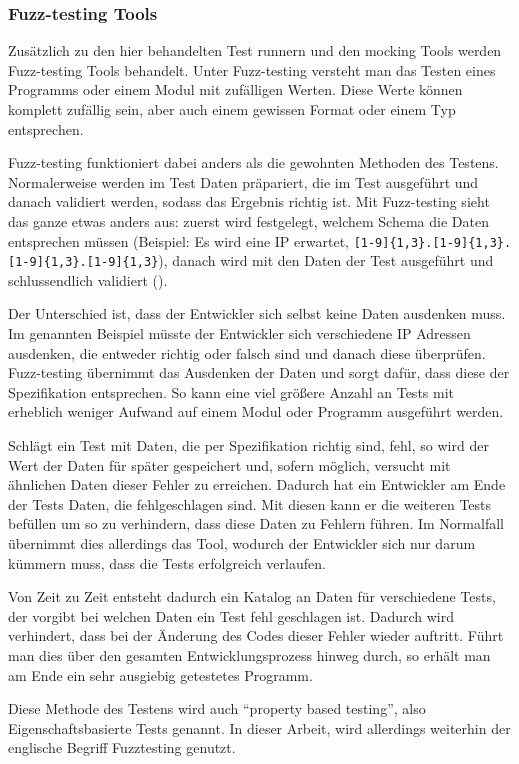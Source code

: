 \subsubsection{Fuzz-testing Tools}\label{python-tools:extlib:fuzz}

Zusätzlich zu den hier behandelten Test runnern und den \gls{mock}ing Tools 
werden Fuzz-testing Tools behandelt. Unter Fuzz-testing 
versteht man das Testen eines Programms oder einem Modul mit zufälligen Werten. 
Diese Werte können komplett zufällig sein, aber auch einem gewissen Format 
oder einem Typ entsprechen.

Fuzz-testing funktioniert dabei anders als die gewohnten Methoden des Testens. 
Normalerweise werden im Test Daten präpariert, die im Test ausgeführt und 
danach validiert werden, sodass das Ergebnis richtig ist. Mit Fuzz-testing 
sieht das ganze etwas anders aus: zuerst wird festgelegt, welchem Schema die 
Daten entsprechen müssen (Beispiel: Es wird eine IP erwartet, 
\lstinline|[1-9]{1,3}.[1-9]{1,3}.[1-9]{1,3}.[1-9]{1,3}|), danach wird mit den 
Daten der Test ausgeführt und schlussendlich validiert 
(\cite{hypothesis:doc:4.18.0}).

Der Unterschied ist, dass der Entwickler sich selbst keine Daten ausdenken 
muss. Im genannten Beispiel müsste der Entwickler sich verschiedene IP Adressen 
ausdenken, die entweder richtig oder falsch sind und danach diese überprüfen. 
Fuzz-testing übernimmt das Ausdenken der Daten und sorgt dafür, dass diese der 
Spezifikation entsprechen. So kann eine viel größere Anzahl an Tests mit 
erheblich weniger Aufwand auf einem Modul oder Programm ausgeführt werden.

Schlägt ein Test mit Daten, die per  Spezifikation richtig sind, fehl, so wird 
der Wert der Daten für später gespeichert und, sofern möglich, versucht mit 
ähnlichen Daten dieser Fehler zu erreichen. Dadurch hat ein Entwickler am Ende 
der Tests Daten, die fehlgeschlagen sind. Mit diesen kann er die weiteren Tests 
befüllen um so  zu verhindern, dass diese Daten zu Fehlern führen. Im 
Normalfall übernimmt dies allerdings das Tool, wodurch der Entwickler sich nur 
darum kümmern muss, dass die Tests erfolgreich verlaufen.

Von Zeit zu Zeit entsteht dadurch ein Katalog an Daten für verschiedene Tests, 
der vorgibt bei welchen Daten ein Test fehl geschlagen ist. Dadurch wird 
verhindert, dass bei der Änderung des Codes dieser Fehler wieder auftritt. 
Führt man  dies über den gesamten Entwicklungsprozess hinweg durch, so erhält 
man am Ende ein sehr ausgiebig getestetes Programm.

Diese Methode des Testens wird auch "`property based testing"', also 
Eigenschaftsbasierte Tests genannt. In dieser Arbeit, wird allerdings weiterhin 
der englische Begriff Fuzztesting genutzt.

